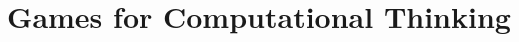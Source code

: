 \documentclass{acm_proc_article-sp}
\begin{document}
\title{Games for Computational Thinking}
%
%
%
%
%
\end{document}
